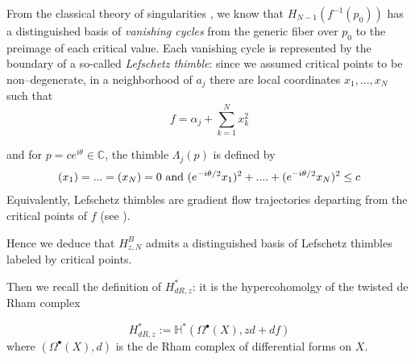 \documentclass{article}
\let\Re\relax
\DeclareMathOperator{\Re}{Re}
\let\Im\relax
\DeclareMathOperator{\Im}{Im}
\theoremstyle{definition}
\newcommand{\C}{\mathbb{C}}
\begin{document}
\begin{center}
\end{center}

From the classical theory of singularities \cite[\textcolor{magenta}{add section; move to end of sentence}]{Arnold}, we know that $H_{N-1}(f^{-1}(p_0))$ has a distinguished basis of \textit{vanishing cycles} from the generic fiber over $p_0$ to the preimage of each critical value. Each vanishing cycle is represented by the boundary of a so-called \textit{Lefschetz thimble}: since we assumed critical points to be non--degenerate, in a neighborhood of $a_j$ there are local coordinates $x_1,...,x_N$ such that 
\[f=\alpha_j+\sum_{k=1}^N x_k^2\]

and for $p=c e^{i\theta}\in\C$, the thimble $\Lambda_j(p)$ is defined by 
\begin{align*}
    \Im(x_1)=...=\Im(x_N)=0 \text{ and } \Re(e^{-i\theta/2}x_1)^2+....+\Re(e^{-i\theta/2}x_N)^2\leq c
\end{align*}
Equivalently, Lefschetz thimbles are gradient flow trajectories departing from the critical points of $f$ (see \cite[page~10]{Witten}).

Hence we deduce that $H_{z, N}^B$ admits a distinguished basis of Lefschetz thimbles labeled by critical points.


Then we recall the definition of $H_{dR,z}^*$: it is the hypercohomolgy of the twisted de Rham complex 

\begin{equation*}
    H_{dR,z}^*:=\mathbb{H}^*( \Omega^\bullet(X), zd+df)
\end{equation*}
where $(\Omega^\bullet(X), d)$ is the de Rham complex of differential forms on $X$. 
\end{document}
